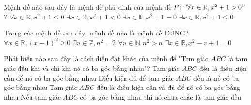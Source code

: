 \begin{ex}%
	Mệnh đề nào sau đây là mệnh đề phủ định của mệnh đề $P\colon "\forall x \in \mathbb{R}, x^2 + 1 > 0"$?
	\choice
	{$\forall x \in \mathbb{R}, x^2 + 1 \le 0$}
	{$\exists x \in \mathbb{R}, x^2 + 1 < 0$}
	{$\exists x \in \mathbb{R}, x^2 + 1 = 0$}
	{\True $\exists x \in \mathbb{R}, x^2 + 1 \le 0$}
\end{ex}

\begin{ex}%
	Trong các mệnh đề sau đây, mệnh đề nào là mệnh đề ĐÚNG?
	\choice
	{\True $\forall x \in \mathbb{R}, (x-1)^2 \ge 0$}
	{$\exists n \in \mathbb{Z}, n^2 = 2$}
	{$\forall n \in \mathbb{N}, n^2 > n$}
	{$\exists x \in \mathbb{R}, x^2 - x + 1 = 0$}
\end{ex}

\begin{ex}%
	Phát biểu nào sau đây là cách diễn đạt khác của mệnh đề "Tam giác $ABC$ là tam giác đều khi và chỉ khi nó có ba góc bằng nhau"?
	\choice
	{Tam giác $ABC$ đều là điều kiện cần để nó có ba góc bằng nhau}
	{Điều kiện đủ để tam giác $ABC$ đều là nó có ba góc bằng nhau}
	{\True Tam giác $ABC$ đều là điều kiện cần và đủ để nó có ba góc bằng nhau}
	{Nếu tam giác $ABC$ có ba góc bằng nhau thì nó chưa chắc là tam giác đều}
\end{ex}

